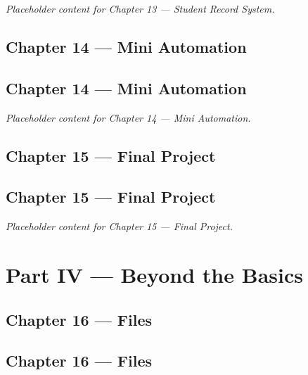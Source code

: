 \documentclass[
  letterpaper,
  DIV=11,
  numbers=noendperiod]{scrreprt}
\begin{document}

\emph{Placeholder content for Chapter 13 --- Student Record System.}

\chapter{Chapter 14 --- Mini
Automation}\label{chapter-14-mini-automation}

\chapter*{Chapter 14 --- Mini
Automation}\label{chapter-14-mini-automation-1}


\emph{Placeholder content for Chapter 14 --- Mini Automation.}

\chapter{Chapter 15 --- Final Project}\label{chapter-15-final-project}

\chapter*{Chapter 15 --- Final
Project}\label{chapter-15-final-project-1}


\emph{Placeholder content for Chapter 15 --- Final Project.}

\part{Part IV --- Beyond the Basics}

\chapter{Chapter 16 --- Files}\label{chapter-16-files}

\chapter*{Chapter 16 --- Files}\label{chapter-16-files-1}
\end{document}
